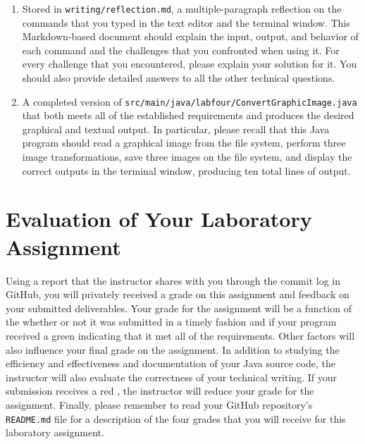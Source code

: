 \documentclass[11pt]{article}
\newcommand{\mainprogramsource}{\lstinline{src/main/java/labfour/ConvertGraphicImage.java}}
\newcommand{\reflection}{\lstinline{writing/reflection.md}}
\newcommand{\program}[1]{\lstinline{#1}}
\newcommand{\checkmark}{\ding{51}}
\newcommand{\naughtmark}{\ding{55}}
\begin{document}
\begin{enumerate}

  \setlength{\itemsep}{0in}

\item Stored in \reflection{}, a multiple-paragraph reflection on the commands
  that you typed in the text editor and the terminal window. This Markdown-based
  document should explain the input, output, and behavior of each command and
  the challenges that you confronted when using it. For every challenge that you
  encountered, please explain your solution for it. You should also provide
  detailed answers to all the other technical questions.

\item A completed version of \mainprogramsource{} that both meets all of the
  established requirements and produces the desired graphical and textual
  output. In particular, please recall that this Java program should read a
  graphical image from the file system, perform three image transformations,
  save three images on the file system, and display the correct outputs in the
  terminal window, producing ten total lines of output.

\end{enumerate}

\section*{Evaluation of Your Laboratory Assignment}

Using a report that the instructor shares with you through the commit log in
GitHub, you will privately received a grade on this assignment and feedback on
your submitted deliverables. Your grade for the assignment will be a function of
the whether or not it was submitted in a timely fashion and if your program
received a green \checkmark{} indicating that it met all of the requirements.
Other factors will also influence your final grade on the assignment. In
addition to studying the efficiency and effectiveness and documentation of your
Java source code, the instructor will also evaluate the correctness of your
technical writing. If your submission receives a red \naughtmark{}, the
instructor will reduce your grade for the assignment. Finally, please remember
to read your GitHub repository's \program{README.md} file for a description of
the four grades that you will receive for this laboratory assignment.

\end{document}
